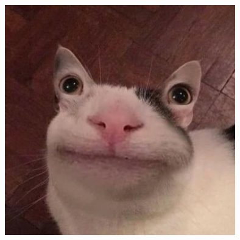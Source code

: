 \documentclass[a4paper,12pt]{book}
\begin{document}
 
\blindmathtrue
 
 
\enlargethispage{\baselineskip}
 
 
\blindtext[2]
 
 
\blinditemize
\blindenumerate
\blinddescription
 
 
 
 
 
\newpage
 
\blindtext
 
 
 
 
\begin{figure}[ht]
\centering
 
 
 
 
\includegraphics[width=10cm]{pic.jpg}
\end{figure}
\blindtext
 
\end{document}
